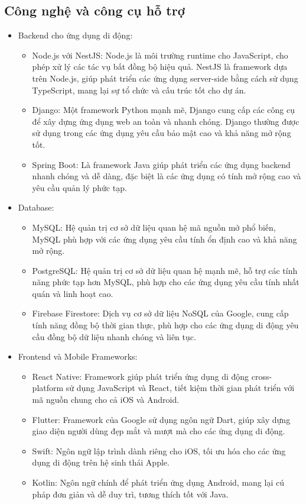     \subsection{Công nghệ và công cụ hỗ trợ}
    \renewcommand{\labelitemi}{--}
    \begin{itemize}
        \item[] Backend cho ứng dụng di động:
        \begin{itemize}
            \item Node.js với NestJS: Node.js là môi trường runtime cho JavaScript, cho phép xử lý các tác vụ bất đồng bộ hiệu quả. NestJS là framework dựa trên Node.js, giúp phát triển các ứng dụng server-side bằng cách sử dụng TypeScript, mang lại sự tổ chức và cấu trúc tốt cho dự án.
            \item Django: Một framework Python mạnh mẽ, Django cung cấp các công cụ để xây dựng ứng dụng web an toàn và nhanh chóng. Django thường được sử dụng trong các ứng dụng yêu cầu bảo mật cao và khả năng mở rộng tốt.
            \item Spring Boot: Là framework Java giúp phát triển các ứng dụng backend nhanh chóng và dễ dàng, đặc biệt là các ứng dụng có tính mở rộng cao và yêu cầu quản lý phức tạp.
        \end{itemize}
    
        \item[] Database:
        \begin{itemize}
            \item MySQL: Hệ quản trị cơ sở dữ liệu quan hệ mã nguồn mở phổ biến, MySQL phù hợp với các ứng dụng yêu cầu tính ổn định cao và khả năng mở rộng.
            \item PostgreSQL: Hệ quản trị cơ sở dữ liệu quan hệ mạnh mẽ, hỗ trợ các tính năng phức tạp hơn MySQL, phù hợp cho các ứng dụng yêu cầu tính nhất quán và linh hoạt cao.
            \item Firebase Firestore: Dịch vụ cơ sở dữ liệu NoSQL của Google, cung cấp tính năng đồng bộ thời gian thực, phù hợp cho các ứng dụng di động yêu cầu đồng bộ dữ liệu nhanh chóng và liên tục.
        \end{itemize}
    
        \item[] Frontend và Mobile Frameworks:
        \begin{itemize}
            \item React Native: Framework giúp phát triển ứng dụng di động cross-platform sử dụng JavaScript và React, tiết kiệm thời gian phát triển với mã nguồn chung cho cả iOS và Android.
            \item Flutter: Framework của Google sử dụng ngôn ngữ Dart, giúp xây dựng giao diện người dùng đẹp mắt và mượt mà cho các ứng dụng di động.
            \item Swift: Ngôn ngữ lập trình dành riêng cho iOS, tối ưu hóa cho các ứng dụng di động trên hệ sinh thái Apple.
            \item Kotlin: Ngôn ngữ chính để phát triển ứng dụng Android, mang lại cú pháp đơn giản và dễ duy trì, tương thích tốt với Java.
        \end{itemize}
    

\end{itemize}
